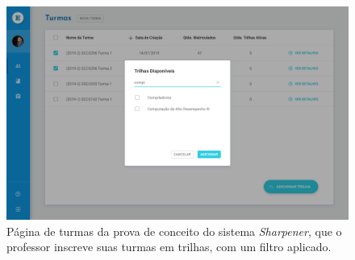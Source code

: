    \begin{figure}[htpb]
    \centering
    \includegraphics[width=\linewidth]{images/mocks/turmaAddTrackSearch.png}
    \caption{Página de turmas da prova de conceito do sistema \emph{Sharpener}, 
    que o professor inscreve suas turmas em trilhas, com um filtro  aplicado.}%
    \label{fig:enroll_track2}
  \end{figure}
\newpage


